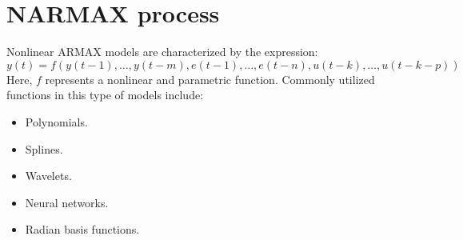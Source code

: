 \section{NARMAX process}

Nonlinear ARMAX models are characterized by the expression:
\[y(t)=f\left(y(t-1),\dots,y(t-m),e(t-1),\dots,e(t-n),u(t-k),\dots,u(t-k-p)\right)\]
Here, $f$ represents a nonlinear and parametric function. 
Commonly utilized functions in this type of models include:
\begin{itemize}
    \item Polynomials. 
    \item Splines. 
    \item Wavelets.
    \item Neural networks.
    \item Radian basis functions. 
\end{itemize}